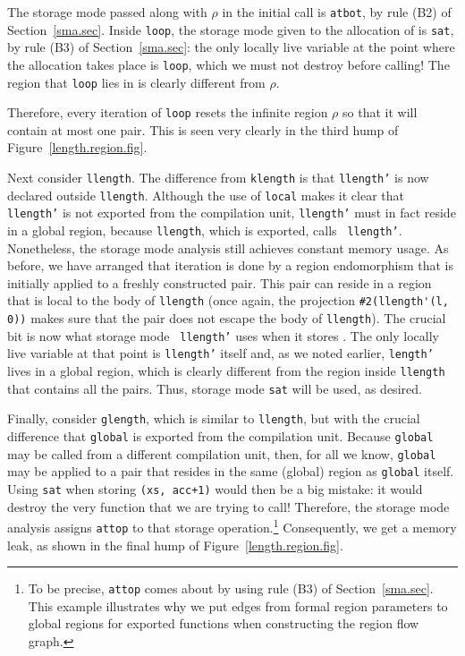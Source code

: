 \documentclass[12pt]{book}
\begin{document}
The storage mode passed along with $\rho$ in the initial call
 is {\tt atbot}, by rule (B2) of
Section~\ref{sma.sec}. Inside {\tt loop}, the storage mode given to
the allocation of  is {\tt sat}, by rule (B3) of
Section~\ref{sma.sec}: the only locally live variable at the point
where the allocation takes place is {\tt loop}, which we must not
destroy before calling! The region that {\tt loop} lies in is clearly
different from $\rho$.

Therefore, every iteration of {\tt loop} resets the infinite region
$\rho$ so that it will contain at most one pair.  This is seen very
clearly in the third hump of Figure~\ref{length.region.fig}.

Next consider {\tt llength}. The difference from {\tt klength} is that
{\tt llength'} is now declared outside {\tt llength}.  Although the
use of {\tt local} makes it clear that {\tt llength'} is not exported
from the compilation unit, {\tt llength'} must in fact reside in a
global region, because {\tt llength}, which is exported, calls {\tt
  llength'}.  Nonetheless, the storage mode analysis still achieves
constant memory usage. As before, we have arranged that iteration is
done by a region endomorphism that is initially applied to a freshly
constructed pair. This pair can reside in a region that is local to
the body of {\tt llength} (once again, the projection
\verb+#2(llength'(l, 0))+ makes sure that the pair does not escape the
body of {\tt llength}).  The crucial bit is now what storage mode {\tt
  llength'} uses when it stores .  The only locally
live variable at that point is {\tt llength'} itself and, as we noted
earlier, {\tt length'} lives in a global region, which is clearly
different from the region inside {\tt llength} that contains all the
pairs.  Thus, storage mode {\tt sat} will be used, as desired.

Finally, consider {\tt glength}, which is similar to {\tt llength},
but with the crucial difference that {\tt global} is exported from the
compilation unit. Because {\tt global} may be called from a different
compilation unit, then, for all we know, {\tt global} may be applied
to a pair that resides in the same (global) region as {\tt global}
itself. Using {\tt sat} when storing {\tt (xs, acc+1)} would then be a
big mistake: it would destroy the very function that we are trying to
call! Therefore, the storage mode analysis assigns {\tt attop} to that
storage operation.\footnote{To be precise, {\tt attop} comes about by
  using rule (B3) of Section~\ref{sma.sec}. This example illustrates
  why we put edges from formal region parameters to global regions for
  exported functions when constructing the region flow graph.}
Consequently, we get a memory leak, as shown in the final hump of
Figure~\ref{length.region.fig}.
\end{document}

